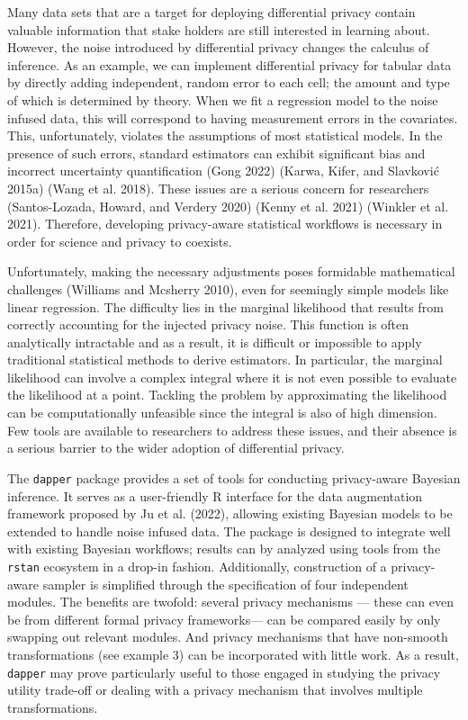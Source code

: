 Many data sets that are a target for deploying differential privacy contain
valuable information that stake holders are still interested in
learning about. However, the noise introduced by differential privacy
changes the calculus of inference. As an example,
we can implement differential privacy for tabular data by directly
adding independent, random error to each cell; the amount and type of which is determined by theory. When we fit a regression model to the noise infused data,
this will correspond to having measurement errors
in the covariates. This, unfortunately, violates the assumptions of most statistical models.
In the presence of such errors, standard estimators can exhibit significant bias and incorrect uncertainty quantification
(Gong 2022) (Karwa, Kifer, and Slavković 2015a) (Wang et al. 2018).
These issues are a serious concern for researchers (Santos-Lozada, Howard, and Verdery 2020) (Kenny et al. 2021) (Winkler et al. 2021).
Therefore, developing privacy-aware statistical workflows is necessary in order
for science and privacy to coexists.

Unfortunately, making the necessary adjustments poses formidable mathematical
challenges (Williams and Mcsherry 2010), even for seemingly simple models like linear regression.
The difficulty lies in the marginal likelihood that results from correctly accounting for the injected
privacy noise. This function is often analytically intractable and as a result,
it is difficult or impossible to apply traditional statistical methods
to derive estimators. In particular, the marginal likelihood can involve a complex
integral where it is not even possible to evaluate the likelihood
at a point. Tackling the problem by approximating the likelihood can be computationally
unfeasible since the integral is also of high dimension.
Few tools are available to researchers to address these issues,
and their absence is a serious barrier to the wider adoption
of differential privacy.

The \texttt{dapper} package provides a set of tools for conducting
privacy-aware Bayesian inference. It serves as a user-friendly R
interface for the data augmentation framework proposed by Ju et al. (2022),
allowing existing Bayesian models to be extended to handle
noise infused data. The package is designed to integrate well with existing Bayesian workflows;
results can by analyzed using tools from the \texttt{rstan} ecosystem in a drop-in fashion. Additionally,
construction of a privacy-aware sampler is simplified
through the specification of four independent modules.
The benefits are twofold: several privacy mechanisms --- these can even be from different formal privacy frameworks---
can be compared easily by only swapping out relevant modules. And privacy mechanisms
that have non-smooth transformations (see example 3) can be incorporated with little work. As a result,
\texttt{dapper} may prove particularly useful to those engaged in studying the privacy utility trade-off or dealing with a privacy mechanism that involves multiple transformations.

